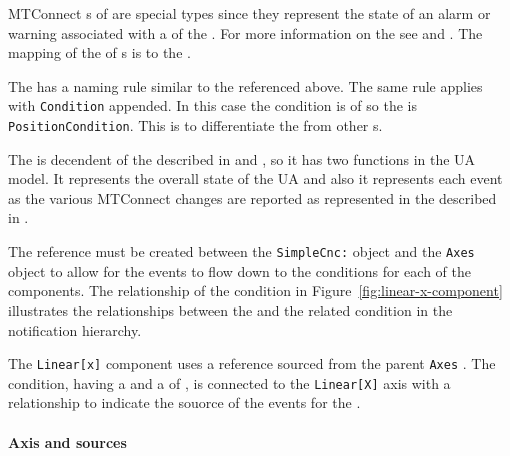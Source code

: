 MTConnect s of   are special types since they represent the state of an alarm or warning associated with a  of the . For more information on the  see \cite{MTCPart2} and \cite{MTCPart3}. The mapping of the   of s is to the .

The  has a naming rule similar to the  referenced above. The same rule applies with \texttt{Condition} appended. In this case the condition is of   so the  is \texttt{PositionCondition}. This is to differentiate the  from other s.

The  is decendent of the  described in \cite{UAPart5} and \cite{UAPart9}, so it has two functions in the UA model. It represents the overall state of the UA  and also it represents each event as the various MTConnect  changes are reported as represented in the  described in \cite{MTCPart3}.

The  reference must be created between the \texttt{SimpleCnc:} object and the \texttt{Axes} object to allow for the events to flow down to the conditions for each of the components. The relationship of the condition in Figure~\ref{fig:linear-x-component} illustrates the relationships between the  and the related condition in the notification hierarchy.

 The \texttt{Linear[x]} component uses a  reference sourced from the parent \texttt{Axes} . The condition, having a  and a  of , is connected to the \texttt{Linear[X]} axis with a  relationship to indicate the souorce of the events for the .
 
\FloatBarrier

\paragraph{ Axis and  sources}


